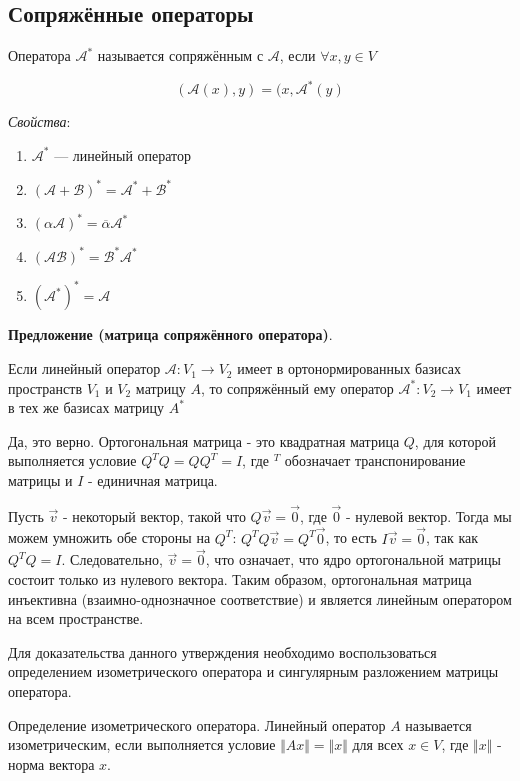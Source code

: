 \documentclass[a4paper]{article}
\begin{document}
\subsection*{Сопряжённые операторы}

Оператора $\mathcal{A}^*$ называется сопряжённым с $\mathcal{A}$, если $\forall x, y \in V$

\[
(\mathcal{A}(x),y) = (x, \mathcal{A}^*(y)
\]

\textit{Свойства}:
\begin{enumerate}
\item $\mathcal{A}^*$ --- линейный оператор
\item $(\mathcal{A} + \mathcal{B})^* = \mathcal{A}^* + \mathcal{B}^*$
\item $(\alpha \mathcal{A})^* = \overline{\alpha}\mathcal{A}^*$
\item $(\mathcal{A} \mathcal{B})^* = \mathcal{B}^* \mathcal{A}^*$
\item $(\mathcal{A}^*)^* = \mathcal{A}$
\end{enumerate}

\begin{htheorem}\textbf{Предложение (матрица сопряжённого оператора)}.

Если линейный оператор $\mathcal{A}: V_1 \rightarrow V_2$ имеет в ортонормированных базисах пространств $V_1$ и $V_2$ матрицу $A$, то сопряжённый ему оператор $\mathcal{A}^*: V_2 \rightarrow V_1$ имеет в тех же базисах матрицу $A^*$

\end{htheorem}


Да, это верно. Ортогональная матрица - это квадратная матрица $Q$, для которой выполняется условие $Q^{T}Q=QQ^{T}=I$, где $^{T}$ обозначает транспонирование матрицы и $I$ - единичная матрица.

Пусть $\vec{v}$ - некоторый вектор, такой что $Q\vec{v} = \vec{0}$, где $\vec{0}$ - нулевой вектор. Тогда мы можем умножить обе стороны на $Q^{T}$: $Q^{T}Q\vec{v} = Q^{T}\vec{0}$, то есть $I\vec{v} = \vec{0}$, так как $Q^{T}Q=I$. Следовательно, $\vec{v} = \vec{0}$, что означает, что ядро ортогональной матрицы состоит только из нулевого вектора. Таким образом, ортогональная матрица инъективна (взаимно-однозначное соответствие) и является линейным оператором на всем пространстве.

Для доказательства данного утверждения необходимо воспользоваться определением изометрического оператора и сингулярным разложением матрицы оператора.

Определение изометрического оператора. Линейный оператор $A$ называется изометрическим, если выполняется условие $\Vert Ax \Vert = \Vert x \Vert$ для всех $x \in V$, где $\Vert x \Vert$ - норма вектора $x$.
\end{document}
